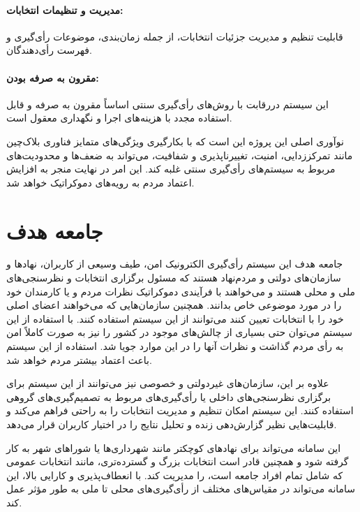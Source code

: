 \documentclass[12pt]{article}
\begin{document}
\paragraph{مدیریت و تنظیمات انتخابات:}
قابلیت تنظیم و مدیریت جزئیات انتخابات، از جمله زمان‌بندی، موضوعات رأی‌گیری و فهرست رأی‌دهندگان.

\paragraph{مقرون به صرفه بودن:}
این سیستم دررقابت با روش‌های رأی‌گیری سنتی اساساً مقرون به صرفه و قابل استفاده مجدد با هزینه‌های اجرا و نگهداری معقول است.


نوآوری اصلی این پروژه این است که با بکارگیری ویژگی‌های متمایز فناوری بلاک‌چین%
مانند تمرکززدایی، امنیت، تغییر‌ناپذیری و شفافیت، می‌تواند به ضعف‌ها و محدودیت‌های مربوط به سیستم‌های رأی‌گیری سنتی غلبه کند. این امر در نهایت منجر به افزایش اعتماد مردم به رویه‌های دموکراتیک خواهد شد.





\section{جامعه هدف}
جامعه هدف این سیستم رأی‌گیری الکترونیک امن، طیف وسیعی از کاربران، نهادها و سازمان‌های دولتی و مردم‌نهاد هستند که مسئول برگزاری انتخابات و نظرسنجی‌های ملی و محلی هستند و می‌خواهند با فرآیندی دموکراتیک نظرات مردم و یا کارمندان خود را در مورد موضوعی خاص بدانند. همچنین سازمان‌هایی که می‌خواهند اعضای اصلی خود را با انتخابات تعیین کنند می‌توانند از این سیستم استفاده کنند. با استفاده از این سیستم می‌توان حتی بسیاری از چالش‌های موجود در کشور را نیز به صورت کاملاً امن به رأی مردم گذاشت و نظرات آنها را در این موارد جویا شد. استفاده از این سیستم باعث اعتماد بیشتر مردم خواهد شد. 

علاوه بر این، سازمان‌های غیردولتی و خصوصی نیز می‌توانند از این سیستم برای برگزاری نظرسنجی‌های داخلی یا رأی‌گیری‌های مربوط به تصمیم‌گیری‌های گروهی استفاده کنند. این سیستم امکان تنظیم و مدیریت انتخابات را به راحتی فراهم می‌کند و قابلیت‌هایی نظیر گزارش‌دهی زنده و تحلیل نتایج را در اختیار کاربران قرار می‌دهد. 

این سامانه می‌تواند برای نهادهای کوچکتر مانند شهرداری‌ها یا شوراهای شهر به کار گرفته شود و همچنین قادر است انتخابات بزرگ و گسترده‌تری، مانند انتخابات عمومی که شامل تمام افراد جامعه است، را مدیریت کند. با انعطاف‌پذیری و کارایی بالا، این سامانه می‌تواند در مقیاس‌های مختلف از رأی‌گیری‌های محلی تا ملی به طور مؤثر عمل کند.
\end{document}

